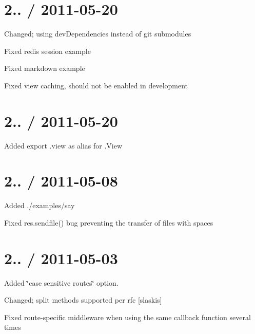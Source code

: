 \section*{2.. / 2011-\/05-\/20 }


\begin{DoxyItemize}
\item Changed; using dev\+Dependencies instead of git submodules
\item Fixed redis session example
\item Fixed markdown example
\item Fixed view caching, should not be enabled in development
\end{DoxyItemize}

\section*{2.. / 2011-\/05-\/20 }


\begin{DoxyItemize}
\item Added export {\ttfamily .view} as alias for {\ttfamily .View}
\end{DoxyItemize}

\section*{2.. / 2011-\/05-\/08 }


\begin{DoxyItemize}
\item Added {\ttfamily ./examples/say}
\item Fixed {\ttfamily res.\+sendfile()} bug preventing the transfer of files with spaces
\end{DoxyItemize}

\section*{2.. / 2011-\/05-\/03 }


\begin{DoxyItemize}
\item Added \char`\"{}case sensitive routes\char`\"{} option.
\item Changed; split methods supported per rfc \mbox{[}slaskis\mbox{]}
\item Fixed route-\/specific middleware when using the same callback function several times
\end{DoxyItemize}

